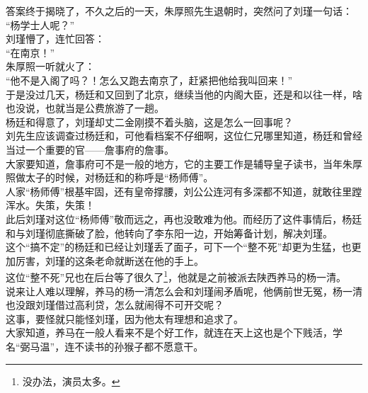 \begin{multicols}{\theparacolNo}
答案终于揭晓了，不久之后的一天，朱厚照先生退朝时，突然问了刘瑾一句话：\\

“杨学士人呢？”\\

刘瑾懵了，连忙回答：\\

“在南京！”\\

朱厚照一听就火了：\\

“他不是入阁了吗？！怎么又跑去南京了，赶紧把他给我叫回来！”\\

于是没过几天，杨廷和又回到了北京，继续当他的内阁大臣，还是和以往一样，啥也没说，也就当是公费旅游了一趟。\\

杨廷和得意了，刘瑾却丈二金刚摸不着头脑，这是怎么一回事呢？\\

刘先生应该调查过杨廷和，可他看档案不仔细啊，这位仁兄哪里知道，杨廷和曾经当过一个重要的官——詹事府的詹事。\\

大家要知道，詹事府可不是一般的地方，它的主要工作是辅导皇子读书，当年朱厚照做太子的时候，对杨廷和的称呼是“杨师傅”。\\

人家“杨师傅”根基牢固，还有皇帝撑腰，刘公公连河有多深都不知道，就敢往里蹚浑水。失策，失策！\\

此后刘瑾对这位“杨师傅”敬而远之，再也没敢难为他。而经历了这件事情后，杨廷和与刘瑾彻底撕破了脸，他转向了李东阳一边，开始筹备计划，解决刘瑾。\\

这个“搞不定”的杨廷和已经让刘瑾丢了面子，可下一个“整不死”却更为生猛，也更加厉害，刘瑾的这条老命就断送在他的手上。\\

这位“整不死”兄也在后台等了很久了\footnote{没办法，演员太多。}，他就是之前被派去陕西养马的杨一清。\\

说来让人难以理解，养马的杨一清怎么会和刘瑾闹矛盾呢，他俩前世无冤，杨一清也没跟刘瑾借过高利贷，怎么就闹得不可开交呢？\\

这事，要怪就只能怪刘瑾，因为他太有理想和追求了。\\

大家知道，养马在一般人看来不是个好工作，就连在天上这也是个下贱活，学名“弼马温”，连不读书的孙猴子都不愿意干。\\


\end{multicols}
